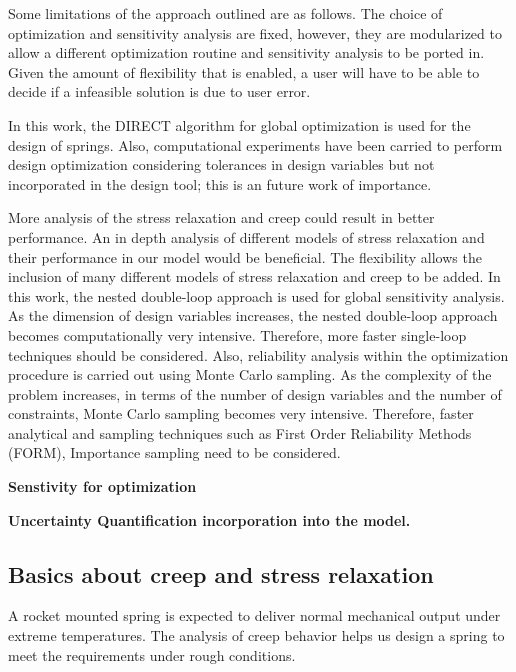 \documentclass[10pt]{article}
\begin{document}
Some limitations of the approach outlined are as follows. The choice of optimization and sensitivity analysis are fixed, however, they are modularized to allow a different optimization routine and sensitivity analysis to be ported in. Given the amount of flexibility that is enabled, a user will have to be able to decide if a infeasible solution is due to user error. 

%

In this work, the DIRECT algorithm for global optimization is used for the design of springs. Also, computational experiments have been carried to perform design optimization considering tolerances in design variables but not incorporated in the design tool; this is an future work of importance. 

More analysis of the stress relaxation and creep could result in better performance. An in depth analysis of different models of stress relaxation and their performance in our model would be beneficial. The flexibility allows the inclusion of many different models of stress relaxation and creep to be added. In this work, the nested double-loop approach is used for global sensitivity analysis. As the dimension of design variables increases, the nested double-loop approach becomes computationally very intensive. Therefore, more faster single-loop techniques should be considered. Also, reliability analysis within the optimization procedure is carried out using Monte Carlo sampling. As the complexity of the problem increases, in terms of the number of design variables and the number of constraints, Monte Carlo sampling becomes very intensive. Therefore, faster analytical and sampling techniques such as First Order Reliability Methods (FORM), Importance sampling need to be considered.


\textbf{Senstivity for optimization}


\textbf{Uncertainty Quantification incorporation into the model.}



\subsection{Basics about creep and stress relaxation}
\label{sec:stress}
A rocket mounted spring is expected to deliver normal mechanical output under extreme temperatures. The analysis of creep behavior helps us design a spring to meet the requirements under rough conditions.
\end{document}
